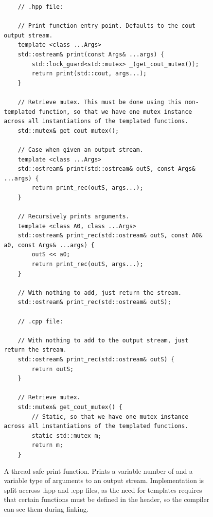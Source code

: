 \begin{figure}
	\begin{lstlisting}
	// .hpp file:

	// Print function entry point. Defaults to the cout output stream.
	template <class ...Args>
	std::ostream& print(const Args& ...args) {
	    std::lock_guard<std::mutex> _(get_cout_mutex());
	    return print(std::cout, args...);
	}

	// Retrieve mutex. This must be done using this non-templated function, so that we have one mutex instance across all instantiations of the templated functions.
	std::mutex& get_cout_mutex();

	// Case when given an output stream.
	template <class ...Args>
	std::ostream& print(std::ostream& outS, const Args& ...args) {
	    return print_rec(outS, args...);
	}

	// Recursively prints arguments.
	template <class A0, class ...Args>
	std::ostream& print_rec(std::ostream& outS, const A0& a0, const Args& ...args) {
	    outS << a0;
	    return print_rec(outS, args...);
	}

	// With nothing to add, just return the stream. 
	std::ostream& print_rec(std::ostream& outS);

	// .cpp file:

	// With nothing to add to the output stream, just return the stream.
	std::ostream& print_rec(std::ostream& outS) {
	    return outS;
	}

	// Retrieve mutex.
	std::mutex& get_cout_mutex() {
		// Static, so that we have one mutex instance across all instantiations of the templated functions.
	    static std::mutex m;
	    return m;
	}
	\end{lstlisting}

	\caption{A thread safe print function. Prints a variable number of and a variable type of arguments to an output stream. Implementation is split accross .hpp and .cpp files, as the need for templates requires that certain functions must be defined in the header, so the compiler can see them during linking.}
	\label{fig:implementation_thread_safe_print}
\end{figure}



